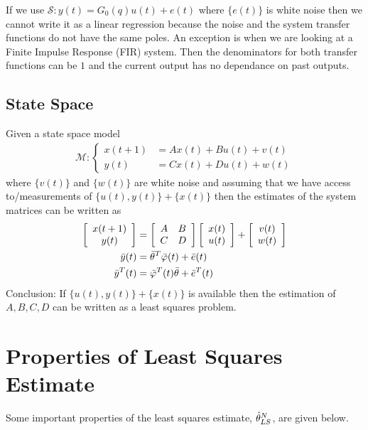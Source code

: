If we use $\mathcal{S}: y(t) = G_0(q)u(t) + e(t)$ where $\{e(t)\}$ is white noise then we cannot write it as a linear regression because the noise and the system transfer functions do not have the same poles.
An exception is when we are looking at a Finite Impulse Response (FIR) system.
Then the denominators for both transfer functions can be $1$ and the current output has no dependance on past outputs.

\subsection{State Space}
Given a state space model
\begin{align*}
\mathcal{M}: \begin{cases} x(t+1)&=Ax(t)+Bu(t)+v(t) \\ y(t)&=Cx(t)+Du(t)+w(t) \end{cases}
\end{align*}
where $\{v(t)\}$ and $\{w(t)\}$ are white noise and assuming that we have access to/measurements of $\{u(t),y(t)\} + \{x(t)\}$ then the estimates of the system matrices can be written as
\begin{align}
\left[\begin{array}{c} x(t+1) \\ y(t) \end{array}\right] &=
\left[\begin{array}{c c} A & B \\ C & D \end{array}\right] \left[\begin{array}{c} x(t) \\ u(t) \end{array}\right] +
\left[\begin{array}{c} v(t) \\ w(t) \end{array}\right] \nonumber\\
\bar{y} (t) &= \bar{\theta}^T\bar{\varphi} (t) + \bar{e} (t) \nonumber\\
\bar{y}^T (t) &= \bar{\varphi}^T (t)\bar{\theta} + \bar{e}^T (t)
\end{align}
Conclusion: If $\{u(t),y(t)\} + \{x(t)\}$ is available then the estimation of $A,B,C,D$ can be written as a least squares problem.

\section{Properties of Least Squares Estimate}
Some important properties of the least squares estimate, $\hat{\theta}_{LS}^N$, are given below.

